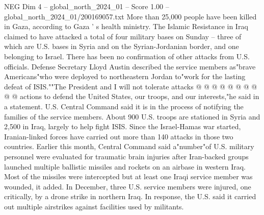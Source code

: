 \begin{textsample}{NEG Dim 4 – global\_north\_2024\_01 – Score 1.00 – global\_north\_2024\_01/200169057.txt}
More than 25,000 people have been killed in Gaza, according to Gaza ' s health ministry.
The Islamic Resistance in Iraq claimed to have attacked a total of four military bases on Sunday -- three of which are U.S. bases in Syria and on the Syrian-Jordanian border, and one belonging to Israel.
There has been no confirmation of other attacks from U.S. officials.
Defense Secretary Lloyd Austin described the service members as"brave Americans"who were deployed to northeastern Jordan to"work for the lasting defeat of ISIS.""The President and I will not tolerate attacks @ @ @ @ @ @ @ @ @ @ actions to defend the United States, our troops, and our interests,"he said in a statement.
U.S.
Central Command said it is in the process of notifying the families of the service members.
About 900 U.S. troops are stationed in Syria and 2,500 in Iraq, largely to help fight ISIS.
Since the Israel-Hamas war started, Iranian-linked forces have carried out more than 140 attacks in those two countries.
Earlier this month, Central Command said a"number"of U.S. military personnel were evaluated for traumatic brain injuries after Iran-backed groups launched multiple ballistic missiles and rockets on an airbase in western Iraq.
Most of the missiles were intercepted but at least one Iraqi service member was wounded, it added.
In December, three U.S. service members were injured, one critically, by a drone strike in northern Iraq.
In response, the U.S. said it carried out multiple airstrikes against facilities used by militants.

\end{textsample}
